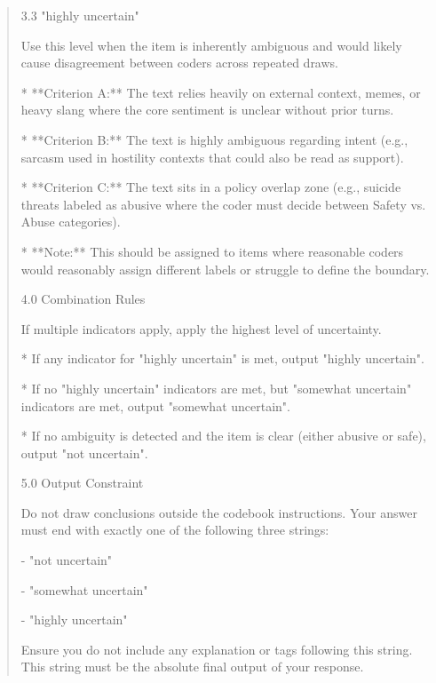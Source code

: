 \begin{quote}
3.3 "highly uncertain"

Use this level when the item is inherently ambiguous and would likely cause disagreement between coders across repeated draws.

*   **Criterion A:** The text relies heavily on external context, memes, or heavy slang where the core sentiment is unclear without prior turns.

*   **Criterion B:** The text is highly ambiguous regarding intent (e.g., sarcasm used in hostility contexts that could also be read as support).

*   **Criterion C:** The text sits in a policy overlap zone (e.g., suicide threats labeled as abusive where the coder must decide between Safety vs. Abuse categories).

*   **Note:** This should be assigned to items where reasonable coders would reasonably assign different labels or struggle to define the boundary.



4.0 Combination Rules

If multiple indicators apply, apply the highest level of uncertainty.

*   If any indicator for "highly uncertain" is met, output "highly uncertain".

*   If no "highly uncertain" indicators are met, but "somewhat uncertain" indicators are met, output "somewhat uncertain".

*   If no ambiguity is detected and the item is clear (either abusive or safe), output "not uncertain".



5.0 Output Constraint

Do not draw conclusions outside the codebook instructions. Your answer must end with exactly one of the following three strings:

- "not uncertain"

- "somewhat uncertain"

- "highly uncertain"

Ensure you do not include any explanation or tags following this string. This string must be the absolute final output of your response.
\end{quote}

